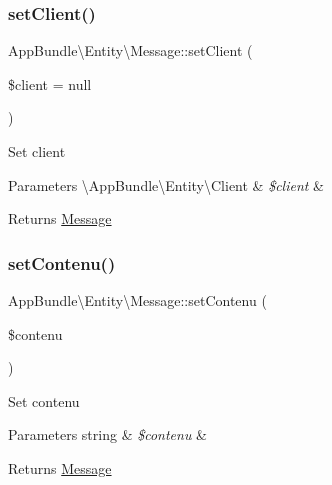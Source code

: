 \subsubsection{\texorpdfstring{set\+Client()}{setClient()}}
{\footnotesize\ttfamily App\+Bundle\textbackslash{}\+Entity\textbackslash{}\+Message\+::set\+Client (\begin{DoxyParamCaption}\item[{\textbackslash{}\hyperlink{class_app_bundle_1_1_entity_1_1_client}{App\+Bundle\textbackslash{}\+Entity\textbackslash{}\+Client}}]{\$client = {\ttfamily null} }\end{DoxyParamCaption})}

Set client


\begin{DoxyParams}[1]{Parameters}
\textbackslash{}\+App\+Bundle\textbackslash{}\+Entity\textbackslash{}\+Client & {\em \$client} & \\
\hline
\end{DoxyParams}
\begin{DoxyReturn}{Returns}
\hyperlink{class_app_bundle_1_1_entity_1_1_message}{Message} 
\end{DoxyReturn}
\mbox{\label{class_app_bundle_1_1_entity_1_1_message_ae47b510faa7817c7551102cdbff5f60a}} 
\subsubsection{\texorpdfstring{set\+Contenu()}{setContenu()}}
{\footnotesize\ttfamily App\+Bundle\textbackslash{}\+Entity\textbackslash{}\+Message\+::set\+Contenu (\begin{DoxyParamCaption}\item[{}]{\$contenu }\end{DoxyParamCaption})}

Set contenu


\begin{DoxyParams}[1]{Parameters}
string & {\em \$contenu} & \\
\hline
\end{DoxyParams}
\begin{DoxyReturn}{Returns}
\hyperlink{class_app_bundle_1_1_entity_1_1_message}{Message} 
\end{DoxyReturn}
\mbox{\label{class_app_bundle_1_1_entity_1_1_message_acced6776fe065b9ece2a39090b38b20d}} 

